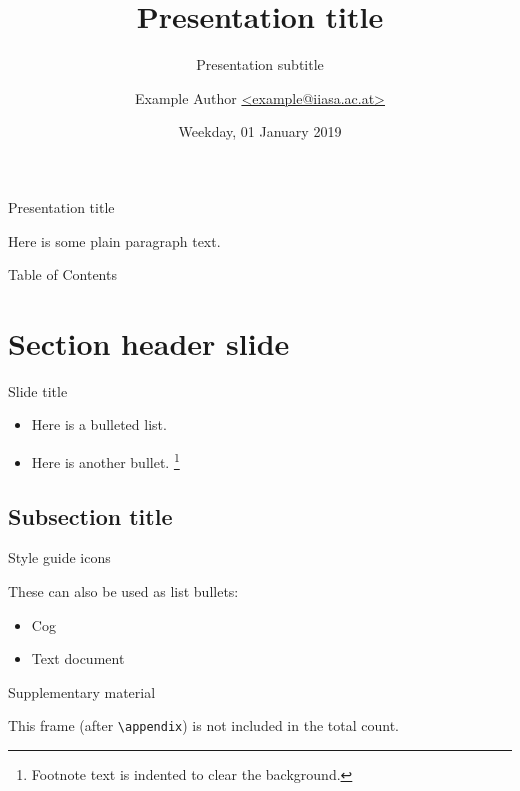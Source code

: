 \documentclass[aspectratio=169]{beamer}
\title{Presentation title}
\subtitle{Presentation subtitle}
\author{Example Author
  \href{mailto:example@iiasa.ac.at}%
  {\ttfamily <example@iiasa.ac.at>}}
\date{Weekday, 01 January 2019}
\institute{Venue for presentation}
\begin{document}
\maketitle

\begin{frame}{Presentation title}

Here is some plain paragraph text.

\end{frame}

\begin{frame}{Table of Contents}

\tableofcontents

\end{frame}

\section{Section header slide}

\begin{frame}{Slide title}

\begin{itemize}
  \item Here is a bulleted list.
  \item Here is another bullet.
    \footnote{Footnote text is indented to clear the background.}
\end{itemize}

\end{frame}

\subsection{Subsection title}

\begin{frame}{Style guide icons}


These can also be used as list bullets:

\begin{itemize}
  \item [\iiasaicon{cog}] Cog
  \item [\iiasaicon{doc-text}] Text document
\end{itemize}

\end{frame}

\appendix

\begin{frame}{Supplementary material}

This frame (after \texttt{\textbackslash{}appendix}) is not included in the total count.

\end{frame}
\end{document}

